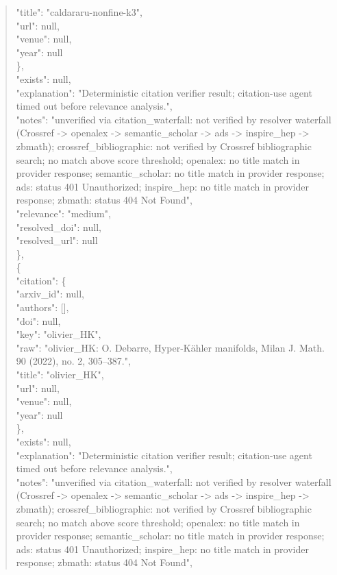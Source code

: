 \documentclass[11pt]{article}
\begin{document}
\begin{quote}
        "title": "caldararu-nonfine-k3",\\
        "url": null,\\
        "venue": null,\\
        "year": null\\
      \},\\
      "exists": null,\\
      "explanation": "Deterministic citation verifier result; citation-use agent timed out before relevance analysis.",\\
      "notes": "unverified via citation\_waterfall: not verified by resolver waterfall (Crossref -> openalex -> semantic\_scholar -> ads -> inspire\_hep -> zbmath); crossref\_bibliographic: not verified by Crossref bibliographic search; no match above score threshold; openalex: no title match in provider response; semantic\_scholar: no title match in provider response; ads: status 401 Unauthorized; inspire\_hep: no title match in provider response; zbmath: status 404 Not Found",\\
      "relevance": "medium",\\
      "resolved\_doi": null,\\
      "resolved\_url": null\\
    \},\\
    \{\\
      "citation": \{\\
        "arxiv\_id": null,\\
        "authors": [],\\
        "doi": null,\\
        "key": "olivier\_HK",\\
        "raw": "olivier\_HK: O. Debarre, Hyper-Kähler manifolds, Milan J. Math. 90 (2022), no. 2, 305--387.",\\
        "title": "olivier\_HK",\\
        "url": null,\\
        "venue": null,\\
        "year": null\\
      \},\\
      "exists": null,\\
      "explanation": "Deterministic citation verifier result; citation-use agent timed out before relevance analysis.",\\
      "notes": "unverified via citation\_waterfall: not verified by resolver waterfall (Crossref -> openalex -> semantic\_scholar -> ads -> inspire\_hep -> zbmath); crossref\_bibliographic: not verified by Crossref bibliographic search; no match above score threshold; openalex: no title match in provider response; semantic\_scholar: no title match in provider response; ads: status 401 Unauthorized; inspire\_hep: no title match in provider response; zbmath: status 404 Not Found",\\

\end{quote}
\end{document}
